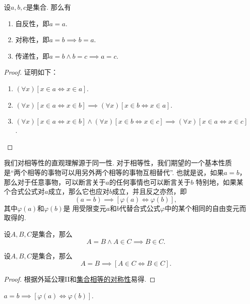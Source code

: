 \begin{property}
设\(a,b,c\)是集合.
那么有\begin{enumerate}
	\item\label{item:集合论.集合相等的自反性}
	自反性，即\(a=a\).
	\item\label{item:集合论.集合相等的对称性}
	对称性，即\(a=b \implies b=a\).
	\item\label{item:集合论.集合相等的传递性}
	传递性，即\(a=b \land b=c \implies a=c\).
\end{enumerate}
\begin{proof}
证明如下：
\begin{enumerate}
	\item \((\forall x)[x \in a \iff x \in a]\).
	\item \((\forall x)[x \in a \iff x \in b] \implies (\forall x)[x \in b \iff x \in a]\).
	\item \((\forall x)[x \in a \iff x \in b] \land (\forall x)[x \in b \iff x \in c]
	\implies (\forall x)[x \in a \iff x \in c]\).
	\qedhere
\end{enumerate}
\end{proof}
\end{property}

我们对相等性的直观理解源于同一性.
对于相等性，我们期望的一个基本性质是“两个相等的事物可以用另外两个相等的事物互相替代”.
也就是说，如果\(a=b\)，那么对于任意事物，可以断言关于\(a\)的任何事情也可以断言关于\(b\)
特别地，如果某个合式公式对\(a\)成立，那么它也应对\(b\)成立，并且反之亦然，即\[
	(a=b)\implies[\varphi(a)\iff\varphi(b)],
\]
其中\(\varphi(a)\)和\(\varphi(b)\)是%
用受限变元\(a\)和\(b\)代替合式公式\(\varphi\)中的某个相同的自由变元而取得的.

\begin{axiom}[外延公理II]
设\(A,B,C\)是集合，那么\[
	A=B \land A \in C \implies B \in C.
\]
\end{axiom}

\begin{property}
设\(A,B,C\)是集合，那么\[
	A=B \implies [A \in C \iff B \in C].
\]
\begin{proof}
根据外延公理II和\hyperref[item:集合论.集合相等的对称性]{集合相等的对称性}易得.
\end{proof}
\end{property}

\begin{theorem}
\(a=b \implies [\varphi(a)\iff\varphi(b)]\).
\end{theorem}

